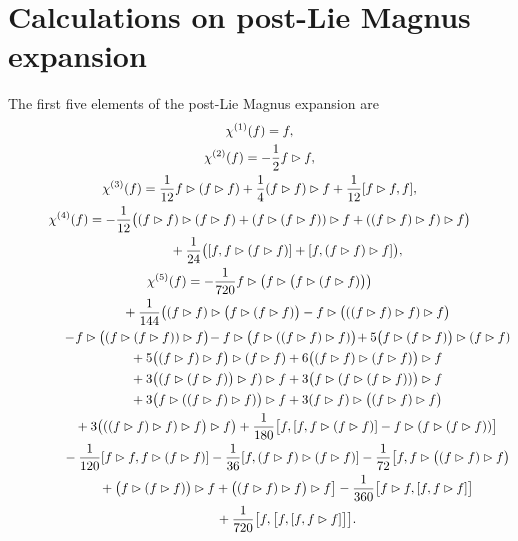 \documentclass[10pt,a4paper]{amsart}
\numberwithin{equation}{section}
\begin{document}
\appendix

\section{Calculations on post-Lie Magnus expansion}\label{C.pl-Magnus}

The first five elements of the post-Lie Magnus expansion are
\begin{gather*}
\chi^{(1)}(f) = f,
\\
\chi^{(2)}(f) = -\frac{1}{2}f \rhd f,
\\
\chi^{(3)}(f) = \frac{1}{12}f \rhd (f \rhd f) + \frac{1}{4}(f \rhd f) \rhd f + \frac{1}{12}[f \rhd f, f],
\\
\chi^{(4)}(f) = -\frac{1}{12}\big( (f \rhd f) \rhd (f \rhd f)
+ (f \rhd (f \rhd f)) \rhd f+ ((f \rhd f) \rhd f) \rhd f \big)
\\ \hphantom{\chi^{(4)}(f) =}
{} + \frac{1}{24}\big([f, f \rhd (f \rhd f)] + [f, (f \rhd f) \rhd f]\big),
\\
\chi^{(5)}(f) = -\frac{1}{720}f \rhd \big( f \rhd \big(f \rhd (f \rhd f)\big)\big)
\\ \hphantom{\chi^{(5)}(f) = }
{}+ \frac{1}{144}\big((f \rhd f) \rhd \big(f \rhd (f \rhd f)\big) - f \rhd \big(((f \rhd f) \rhd f) \rhd f\big)
\\ \hphantom{\chi^{(5)}(f) = }
{}-\! f \rhd \big((f \rhd (f \rhd f)) \rhd f\big) \!- f \rhd \big(f \rhd ((f \rhd f) \rhd f)\big) \!+ 5\big(f \rhd (f \rhd f)\big) \rhd (f \rhd f)
\\ \hphantom{\chi^{(5)}(f) = }
{} +5\big((f \rhd f) \rhd f\big) \rhd (f \rhd f) + 6\big((f \rhd f) \rhd (f \rhd f)\big) \rhd f
\\ \hphantom{\chi^{(5)}(f) = }
{} + 3\big((f \rhd (f \rhd f)\big) \rhd f ) \rhd f+
 3\big(f \rhd (f \rhd (f \rhd f))\big) \rhd f
\\ \hphantom{\chi^{(5)}(f) = }
{}+ 3\big(f \rhd ((f \rhd f) \rhd f)\big) \rhd f + 3(f \rhd f) \rhd \big((f \rhd f) \rhd f\big)
\\ \hphantom{\chi^{(5)}(f) = }
{}+ 3\big(((f \rhd f) \rhd f) \rhd f\big) \rhd f \big) + \frac{1}{180}\big[f, [f, f \rhd (f \rhd f)] - f \rhd (f \rhd (f \rhd f))\big]
\\ \hphantom{\chi^{(5)}(f) = }
{}- \frac{1}{120} [ f \rhd f, f \rhd (f \rhd f)]- \frac{1}{36}[f, (f \rhd f) \rhd (f \rhd f)]- \frac{1}{72}\big[f, f \rhd \big((f \rhd f) \rhd f\big)
\\ \hphantom{\chi^{(5)}(f) = }
{}+ \big(f \rhd (f \rhd f)\big) \rhd f + \big((f \rhd f) \rhd f\big) \rhd f\big]-\frac{1}{360}\big[ f \rhd f, [f, f \rhd f]\big]
\\ \hphantom{\chi^{(5)}(f) = }
{} + \frac{1}{720}\big[f, \big[f, [f, f \rhd f]\big]\big].
\end{gather*}
\end{document}
